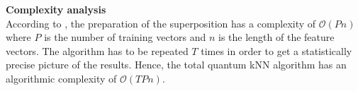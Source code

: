 \begin{greenbox}
\textbf{Complexity analysis}\\
\newline
According to , the preparation of the superposition has a complexity of $\mathcal{O}(Pn)$ where $P$ is the number of training vectors and $n$ is the length of the feature vectors. The algorithm has to be repeated $T$ times in order to get a statistically precise picture of the results. Hence, the total quantum kNN algorithm has an algorithmic complexity of $\mathcal{O}(TPn)$. 
\end{greenbox}

